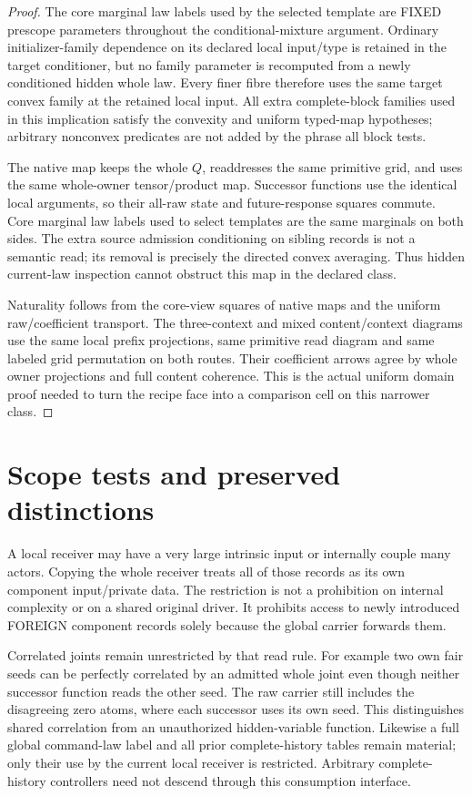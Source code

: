 \documentclass[11pt]{article}
\begin{document}
\begin{proof}
The core marginal law labels used by the selected template are FIXED prescope parameters throughout the conditional-mixture argument. Ordinary initializer-family dependence on its declared local input/type is retained in the target conditioner, but no family parameter is recomputed from a newly conditioned hidden whole law. Every finer fibre therefore uses the same target convex family at the retained local input. All extra complete-block families used in this implication satisfy the convexity and uniform typed-map hypotheses; arbitrary nonconvex predicates are not added by the phrase all block tests.

The native map keeps the whole $Q$, readdresses the same primitive grid, and uses the same whole-owner tensor/product map. Successor functions use the identical local arguments, so their all-raw state and future-response squares commute. Core marginal law labels used to select templates are the same marginals on both sides. The extra source admission conditioning on sibling records is not a semantic read; its removal is precisely the directed convex averaging. Thus hidden current-law inspection cannot obstruct this map in the declared class.

Naturality follows from the core-view squares of native maps and the uniform raw/coefficient transport. The three-context and mixed content/context diagrams use the same local prefix projections, same primitive read diagram and same labeled grid permutation on both routes. Their coefficient arrows agree by whole owner projections and full content coherence. This is the actual uniform domain proof needed to turn the recipe face into a comparison cell on this narrower class.\end{proof}

\section{Scope tests and preserved distinctions}
A local receiver may have a very large intrinsic input or internally couple many actors. Copying the whole receiver treats all of those records as its own component input/private data. The restriction is not a prohibition on internal complexity or on a shared original driver. It prohibits access to newly introduced FOREIGN component records solely because the global carrier forwards them.

Correlated joints remain unrestricted by that read rule. For example two own fair seeds can be perfectly correlated by an admitted whole joint even though neither successor function reads the other seed. The raw carrier still includes the disagreeing zero atoms, where each successor uses its own seed. This distinguishes shared correlation from an unauthorized hidden-variable function. Likewise a full global command-law label and all prior complete-history tables remain material; only their use by the current local receiver is restricted. Arbitrary complete-history controllers need not descend through this consumption interface.
\end{document}
